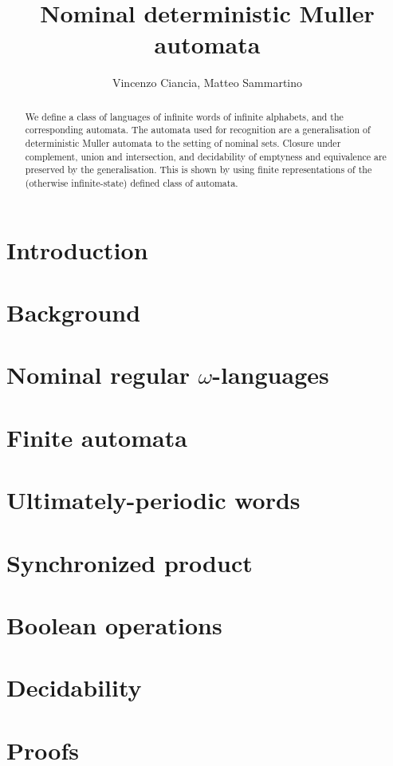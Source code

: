 \documentclass[orivec]{llncs}
\title{Nominal deterministic Muller automata}
\author{Vincenzo Ciancia, Matteo Sammartino}
\institute{}
\begin{document}
\maketitle

\begin{abstract}
 We define a class of languages of infinite words of infinite alphabets, and the corresponding automata. The automata used for recognition are a generalisation of deterministic Muller automata to the setting of nominal sets. Closure under complement, union and intersection, and decidability of emptyness and equivalence are preserved by the generalisation. This is shown by using finite representations of the (otherwise infinite-state) defined class of automata.
\end{abstract}

\section{Introduction}\label{sec:introduction}

\section{Background}\label{sec:background}

\section{Nominal regular $\omega$-languages}\label{sec:languages}


\section{Finite automata}\label{sec:hd-automata}



\section{Ultimately-periodic words}\label{sec:up-determinacy}

\section{Synchronized product}\label{sec:sync-product}


\section{Boolean operations}\label{sec:boolean-operations}


\section{Decidability}\label{sec:decidability}

\appendix
\section{Proofs}




\end{document}
